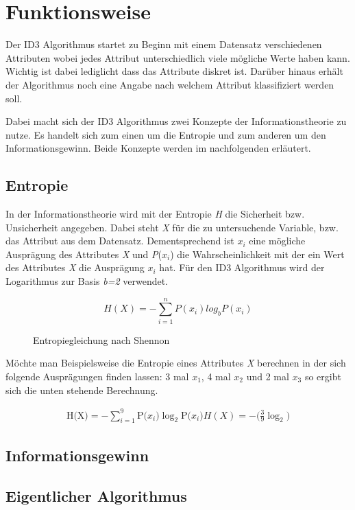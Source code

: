 \section{Funktionsweise}
\label{id3:funktionsweise}

Der ID3 Algorithmus startet zu Beginn mit einem Datensatz verschiedenen Attributen wobei jedes Attribut unterschiedlich viele mögliche Werte haben kann. Wichtig ist dabei lediglicht dass das Attribute diskret ist. Darüber hinaus erhält der Algorithmus noch eine Angabe nach welchem Attribut klassifiziert werden soll. \autocite{ImplementationID3}

Dabei macht sich der ID3 Algorithmus zwei Konzepte der Informationstheorie zu nutze. Es handelt sich zum einen um die Entropie und zum anderen um den Informationsgewinn. Beide Konzepte werden im nachfolgenden erläutert.

\subsection{Entropie}
In der Informationstheorie wird mit der Entropie \textit{H} die Sicherheit bzw. Unsicherheit angegeben. Dabei steht \textit{X} für die zu untersuchende Variable, bzw. das Attribut aus dem Datensatz. Dementsprechend ist $x_{i}$ eine mögliche Ausprägung des Attributes \textit{X} und \textit{P}($x_{i}$) die Wahrscheinlichkeit mit der ein Wert des Attributes \textit{X} die Ausprägung $x_{i}$ hat. \autocite{Entropy:online} Für den ID3 Algorithmus wird der Logarithmus zur Basis \textit{b=2} verwendet. \autocite{ImplementationID3}

\begin{figure}[htbp]
    \begin{equation}
        H(X) = - \sum_{i=1}^{n} P(x_{i}) log_{b} P(x_{i})
    \end{equation}
    \caption{Entropiegleichung nach Shennon \autocite{Entropy:online}}
\end{figure}

Möchte man Beispielsweise die Entropie eines Attributes \textit{X} berechnen in der sich folgende Ausprägungen finden lassen: 3 mal $x_{1}$, 4 mal $x_{2}$ und 2 mal $x_{3}$ so ergibt sich die unten stehende Berechnung.

\begin{align}
    \begin{equation}
        \text{H(X)} = -\sum_{i=1}^{9} \text{P(} x_{i} \text{)}  \log_{2} \text{P(} x_{i} \text{)}
        H(X) = - \text{(} \frac{3}{9} \log_{2} \text{)}
    \end{equation}
\end{align}

\subsection{Informationsgewinn}

\subsection{Eigentlicher Algorithmus}